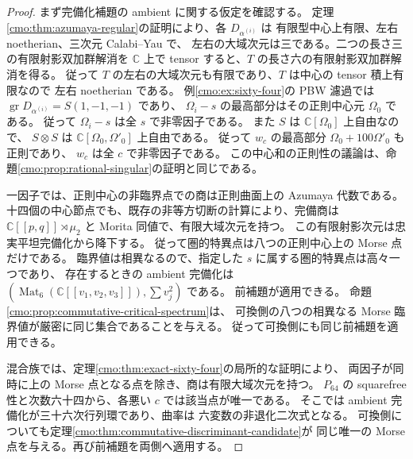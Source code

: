 \begin{proof}
まず完備化補題の ambient に関する仮定を確認する。
定理\ref{cmo:thm:azumaya-regular}の証明により、各 $D_{\alpha^{(i)}}$ は
有限型中心上有限、左右 noetherian、三次元 Calabi--Yau で、
左右の大域次元は三である。二つの長さ三の有限射影双加群解消を
$\mathbb C$ 上で tensor すると、$T$ の長さ六の有限射影双加群解消を得る。
従って $T$ の左右の大域次元も有限であり、$T$ は中心の tensor 積上有限なので
左右 noetherian である。
例\ref{cmo:ex:sixty-four}の PBW 濾過では
$\operatorname{gr}D_{\alpha^{(i)}}=S(1,-1,-1)$ であり、
$\Omega_i-s$ の最高部分はその正則中心元 $\Omega_0$ である。
従って $\Omega_i-s$ は全 $s$ で非零因子である。
また $S$ は $\mathbb C[\Omega_0]$ 上自由なので、
$S\otimes S$ は $\mathbb C[\Omega_0,\Omega'_0]$ 上自由である。
従って $w_c$ の最高部分 $\Omega_0+100\Omega'_0$ も正則であり、
$w_c$ は全 $c$ で非零因子である。
この中心和の正則性の議論は、命題\ref{cmo:prop:rational-singular}の証明と同じである。

一因子では、正則中心の非臨界点での商は正則曲面上の Azumaya 代数である。
十四個の中心節点でも、既存の非等方切断の計算により、完備商は
$\mathbb C[[p,q]]\rtimes\mu_2$ と Morita 同値で、有限大域次元を持つ。
この有限射影次元は忠実平坦完備化から降下する。
従って圏的特異点は八つの正則中心上の Morse 点だけである。
臨界値は相異なるので、指定した $s$ に属する圏的特異点は高々一つであり、
存在するときの ambient 完備化は
$(\operatorname{Mat}_6(\mathbb C[[v_1,v_2,v_3]]),\sum v_j^2)$ である。
前補題が適用できる。
命題\ref{cmo:prop:commutative-critical-spectrum}は、
可換側の八つの相異なる Morse 臨界値が厳密に同じ集合であることを与える。
従って可換側にも同じ前補題を適用できる。

混合族では、定理\ref{cmo:thm:exact-sixty-four}の局所的な証明により、
両因子が同時に上の Morse 点となる点を除き、商は有限大域次元を持つ。
$P_{64}$ の squarefree 性と次数六十四から、各悪い $c$ では該当点が唯一である。
そこでは ambient 完備化が三十六次行列環であり、曲率は
六変数の非退化二次式となる。
可換側についても定理\ref{cmo:thm:commutative-discriminant-candidate}が
同じ唯一の Morse 点を与える。再び前補題を両側へ適用する。
\end{proof}

